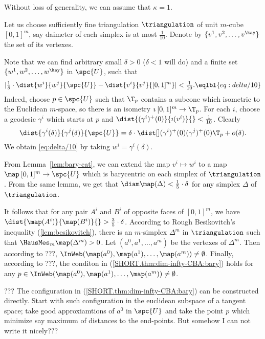 Without loss of generality, we can assume that $\kappa=1$.

Let us choose sufficiently fine triangulation $\triangulation$ of unit $m$-cube $[0,1]^m$,
say daimeter of each simplex is at most $\tfrac1{10}$.
Denote by $\{v^1,v^2,\dots,v^\kay\}$ the set of its vertexes.

Note that we can find arbitrary small $\delta>0$ ($\delta<1$ will do)
and  a finite set $\{w^1,w^2,\dots,w^\kay\}$ in $\spc{U}$,
such that 
$$|\tfrac{1}{\delta}\cdot\dist{w^i}{w^j}{\spc{U}}
-\dist{v^i}{v^j}{[0,1]^m}|
<
\tfrac1{10}.
\eqlbl{eq:delta/10}$$ 
Indeed, choose $p\in \spc{U}$ such that $\T_p$ contains a subcone which isometric to the Euclidean $m$-space, so there is an isometry $\imath\:[0,1]^m\to \T_p$.
For each $i$,
choose a geodesic $\gamma^i$ which starts at $p$ 
and $\dist{(\gamma^i)^+(0)}{\imath(v^i)}{}<\tfrac1{10}$.
Clearly
$$\dist{\gamma^i(\delta)}{\gamma^j(\delta)}{\spc{U}}
=
\delta\cdot\dist[{{}}]{(\gamma^i)^+(0)}{(\gamma^j)^+(0)}{\T_p}+o(\delta).$$
We obtain \ref{eq:delta/10} by taking $w^i=\gamma^i(\delta)$.

From Lemma~\ref{lem:bary-cat},
we can extend the map $v^i\mapsto w^i$ to a map $\map\:[0,1]^m\to \spc{U}$ which is barycentric on each simplex of $\triangulation$.
From the same lemma, we get that $\diam\map(\Delta)<\tfrac15\cdot\delta$ for any simplex $\Delta$ of $\triangulation$.

It follows that for any pair $A^i$ and $B^i$ of opposite faces of $[0,1]^m$,
we have $\dist{\map(A^i)}{\map(B^i)}{}>\tfrac35\cdot\delta$.
According to Rough Besikovitch's inequality (\ref{lem:besikovitch}),
there is an $m$-simplex $\Delta^m$ in $\triangulation$ such that $\HausMes_m\map(\Delta^m)>0$.
Let $(a^0,a^1,\dots,a^m)$ be the vertexes of $\Delta^m$.
Then according to ???,  $\InWeb(\map(a^0),\map(a^1),\dots,\map(a^m))\not=\emptyset$.
Finally, according to ???, the conditon in (\ref{SHORT.thm:dim-infty-CBA:bary}) holds for any $p\in \InWeb(\map(a^0),\map(a^1),\dots,\map(a^m))\not=\emptyset$.

??? The configuration in (\ref{SHORT.thm:dim-infty-CBA:bary}) can be constructed directly.
Start with such configuration in the euclidean subspace of a tangent space;
take good approxiamtions of $a^0$ in $\spc{U}$ and take the point $p$ which minimize say maximum of distances to the end-points. 
But somehow I can not write it nicely???













